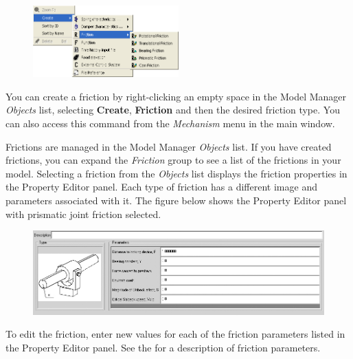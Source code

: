 \begin{figure}
  \vspace{-4mm}
  \includegraphics[width=0.5\textwidth]{Figures/4-Friction}
\end{figure}

You can create a friction by right-clicking an empty space in the Model
Manager {\sl Objects} list, selecting \textbf{Create}, \textbf{Friction} and
then the desired friction type. You can also access this command from the
{\sl Mechanism} menu in the main window.

Frictions are managed in the Model Manager {\sl Objects} list.
If you have created frictions, you can expand the {\sl Friction} group to see
a list of the frictions in your model.
Selecting a friction from the {\sl Objects} list displays the friction
properties in the Property Editor panel. Each type of friction has a different
image and parameters associated with it. The figure below shows the
Property Editor panel with prismatic joint friction selected.

\clearpage
\begin{figure}[H]
  \includegraphics[width=\textwidth]{Figures/friction properties panel}
\end{figure}

To edit the friction, enter new values for each of the friction parameters
listed in the Property Editor panel.
See the 
for a description of friction parameters.




